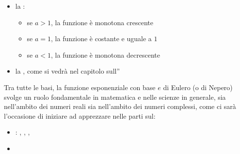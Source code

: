 \documentclass[letterpaper,10pt,italian]{jupyterBook}
\begin{document}
\sphinxAtStartPar
{}
\begin{itemize}
\item {} 
\sphinxAtStartPar
la {\hyperref[\detokenize{ch/precalculus/real-functions:math-hs-precalculus-real-functions-types}]{}}:
\begin{itemize}
\item {} 
\sphinxAtStartPar
se \(a > 1\), la funzione è monotona crescente

\item {} 
\sphinxAtStartPar
se \(a = 1\), la funzione è costante e uguale a \(1\)

\item {} 
\sphinxAtStartPar
se \(a < 1\), la funzione è monotona decrescente

\end{itemize}

\item {} 
\sphinxAtStartPar
la {\hyperref[\detokenize{ch/infinitesimal_calculus/analysis:infinitesimal-calculus-continuous-fun}]{}}, come si vedrà nel capitolo sull”{\hyperref[\detokenize{ch/infinitesimal_calculus/analysis:infinitesimal-calculus-analysis}]{}}

\end{itemize}

\sphinxAtStartPar
Tra tutte le basi, la funzione esponenziale con base \(e\) di Eulero (o di Nepero) svolge un ruolo fondamentale in matematica e nelle scienze in generale, sia nell’ambito dei numeri reali sia nell’ambito dei numeri complessi, come ci sarà l’occasione di iniziare ad apprezzare nelle parti sul:
\begin{itemize}
\item {} 
\sphinxAtStartPar
{\hyperref[\detokenize{ch/calculus:math-hs-calculus}]{}}: {\hyperref[\detokenize{ch/infinitesimal_calculus/analysis:infinitesimal-calculus-limits}]{}}, {\hyperref[\detokenize{ch/infinitesimal_calculus/derivatives:infinitesimal-calculus-derivatives}]{}}, {\hyperref[\detokenize{ch/infinitesimal_calculus/integrals:infinitesimal-calculus-integrals}]{}}, {\hyperref[\detokenize{ch/ode:ode-hs}]{}}

\item {} 
\sphinxAtStartPar
{\hyperref[\detokenize{ch/algebra/complex-algebra:math-hs-algebra-complex}]{}}

\end{itemize}
\end{document}
